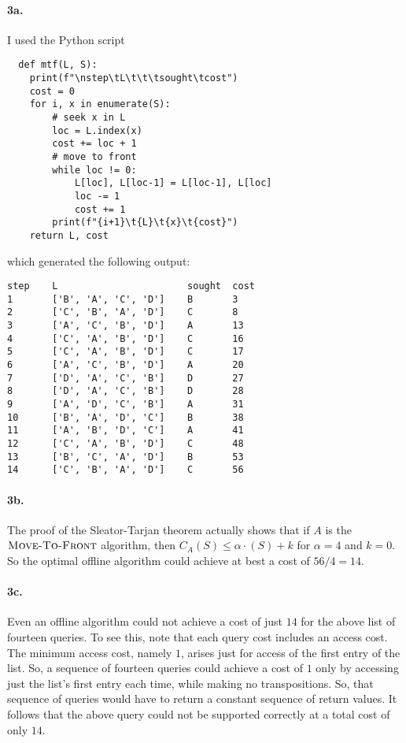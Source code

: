 \documentclass[
]{article}
\begin{document}
\paragraph{3a.} I used the Python script
\begin{verbatim}
  def mtf(L, S):
    print(f"\nstep\tL\t\t\tsought\tcost")
    cost = 0
    for i, x in enumerate(S):
        # seek x in L
        loc = L.index(x)    
        cost += loc + 1
        # move to front
        while loc != 0:
            L[loc], L[loc-1] = L[loc-1], L[loc]
            loc -= 1
            cost += 1
        print(f"{i+1}\t{L}\t{x}\t{cost}")
    return L, cost
\end{verbatim}
which generated the following output:
\begin{verbatim}
step    L                       sought  cost
1       ['B', 'A', 'C', 'D']    B       3
2       ['C', 'B', 'A', 'D']    C       8
3       ['A', 'C', 'B', 'D']    A       13
4       ['C', 'A', 'B', 'D']    C       16
5       ['C', 'A', 'B', 'D']    C       17
6       ['A', 'C', 'B', 'D']    A       20
7       ['D', 'A', 'C', 'B']    D       27
8       ['D', 'A', 'C', 'B']    D       28
9       ['A', 'D', 'C', 'B']    A       31
10      ['B', 'A', 'D', 'C']    B       38
11      ['A', 'B', 'D', 'C']    A       41
12      ['C', 'A', 'B', 'D']    C       48
13      ['B', 'C', 'A', 'D']    B       53
14      ['C', 'B', 'A', 'D']    C       56
\end{verbatim}

\paragraph{3b.}  The proof of the Sleator-Tarjan theorem actually shows that if $A$ is the $\textsc{Move-To-Front}$ algorithm, then $C_A(S)\leq \alpha \cdot(S)+k$ for $\alpha=4$ and $k=0$.  So the optimal offline algorithm could achieve at best a cost of $56/4 = 14$.

\paragraph{3c.} Even an offline algorithm could not achieve a cost of just $14$ for the above list of fourteen queries.  
To see this, note that each query cost includes an access cost. The minimum access cost, namely $1$, arises just for access of the first entry of the list.  So, a sequence of fourteen queries could achieve a cost of $1$ only by accessing just the list's first entry each time, while making no transpositions.  So, that sequence of queries would have to return a constant sequence of return values. It follows that the above query could not be supported correctly at a total cost of only $14$.
\end{document}
